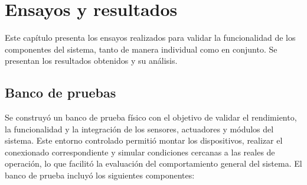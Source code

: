 \chapter{Ensayos y resultados} %

\label{Chapter4}

Este capítulo presenta los ensayos realizados para validar la funcionalidad de
los componentes del sistema, tanto de manera individual como en conjunto. Se
presentan los resultados obtenidos y su análisis.

\section{Banco de pruebas}

Se construyó un banco de prueba físico con el objetivo de validar el
rendimiento, la funcionalidad y la integración de los sensores, actuadores y
módulos del sistema. Este entorno controlado permitió montar los dispositivos,
realizar el conexionado correspondiente y simular condiciones cercanas a las
reales de operación, lo que facilitó la evaluación del comportamiento general
del sistema. El banco de prueba incluyó los siguientes componentes:

